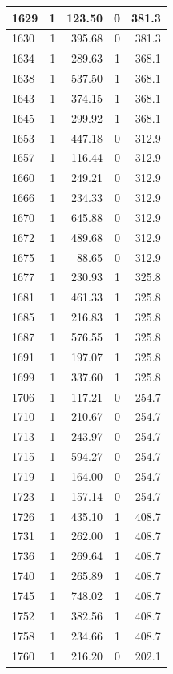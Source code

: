 \documentclass[
  spanish,
  12pt,
]{book}
\begin{document}
\begin{tabular}{l|r|r|r|r}
\hline
1629 & 1 & 123.50 & 0 & 381.3\\
\hline
1630 & 1 & 395.68 & 0 & 381.3\\
\hline
1634 & 1 & 289.63 & 1 & 368.1\\
\hline
1638 & 1 & 537.50 & 1 & 368.1\\
\hline
1643 & 1 & 374.15 & 1 & 368.1\\
\hline
1645 & 1 & 299.92 & 1 & 368.1\\
\hline
1653 & 1 & 447.18 & 0 & 312.9\\
\hline
1657 & 1 & 116.44 & 0 & 312.9\\
\hline
1660 & 1 & 249.21 & 0 & 312.9\\
\hline
1666 & 1 & 234.33 & 0 & 312.9\\
\hline
1670 & 1 & 645.88 & 0 & 312.9\\
\hline
1672 & 1 & 489.68 & 0 & 312.9\\
\hline
1675 & 1 & 88.65 & 0 & 312.9\\
\hline
1677 & 1 & 230.93 & 1 & 325.8\\
\hline
1681 & 1 & 461.33 & 1 & 325.8\\
\hline
1685 & 1 & 216.83 & 1 & 325.8\\
\hline
1687 & 1 & 576.55 & 1 & 325.8\\
\hline
1691 & 1 & 197.07 & 1 & 325.8\\
\hline
1699 & 1 & 337.60 & 1 & 325.8\\
\hline
1706 & 1 & 117.21 & 0 & 254.7\\
\hline
1710 & 1 & 210.67 & 0 & 254.7\\
\hline
1713 & 1 & 243.97 & 0 & 254.7\\
\hline
1715 & 1 & 594.27 & 0 & 254.7\\
\hline
1719 & 1 & 164.00 & 0 & 254.7\\
\hline
1723 & 1 & 157.14 & 0 & 254.7\\
\hline
1726 & 1 & 435.10 & 1 & 408.7\\
\hline
1731 & 1 & 262.00 & 1 & 408.7\\
\hline
1736 & 1 & 269.64 & 1 & 408.7\\
\hline
1740 & 1 & 265.89 & 1 & 408.7\\
\hline
1745 & 1 & 748.02 & 1 & 408.7\\
\hline
1752 & 1 & 382.56 & 1 & 408.7\\
\hline
1758 & 1 & 234.66 & 1 & 408.7\\
\hline
1760 & 1 & 216.20 & 0 & 202.1\\

\end{tabular}
\end{document}
